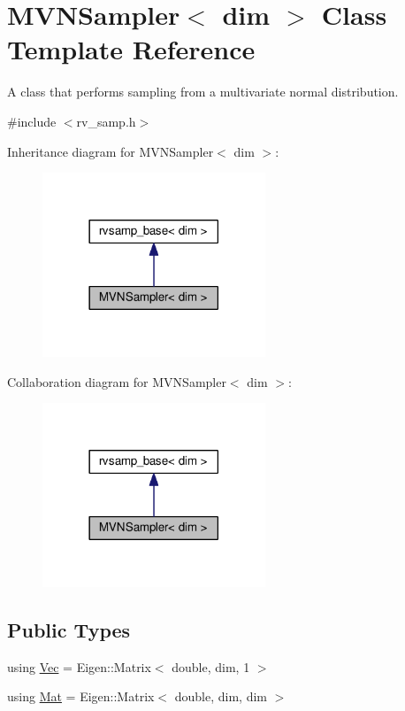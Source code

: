 \hypertarget{classMVNSampler}{}\section{M\+V\+N\+Sampler$<$ dim $>$ Class Template Reference}
\label{classMVNSampler}


A class that performs sampling from a multivariate normal distribution.  




{\ttfamily \#include $<$rv\+\_\+samp.\+h$>$}



Inheritance diagram for M\+V\+N\+Sampler$<$ dim $>$\+:\nopagebreak
\begin{figure}[H]
\begin{center}
\leavevmode
\includegraphics[width=189pt]{classMVNSampler__inherit__graph}
\end{center}
\end{figure}


Collaboration diagram for M\+V\+N\+Sampler$<$ dim $>$\+:\nopagebreak
\begin{figure}[H]
\begin{center}
\leavevmode
\includegraphics[width=189pt]{classMVNSampler__coll__graph}
\end{center}
\end{figure}
\subsection*{Public Types}
\begin{DoxyCompactItemize}
\item 
using \hyperlink{classMVNSampler_a409f73d7a66202b7ecff0f86e9afe3c1}{Vec} = Eigen\+::\+Matrix$<$ double, dim, 1 $>$
\item 
using \hyperlink{classMVNSampler_a008de968c985ee41633d53d25174701f}{Mat} = Eigen\+::\+Matrix$<$ double, dim, dim $>$
\end{DoxyCompactItemize}
